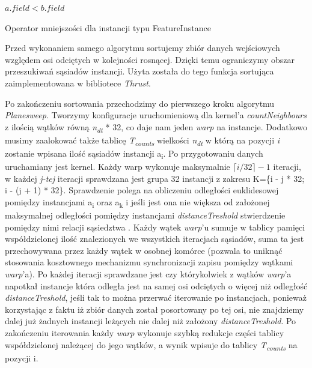 \documentclass[12pt]{article}
\makeatletter
\newcounter{operator}
\newcounter{algorytm}
\newenvironment{algorytm}[1][htb]
  {
  \renewcommand*{\algorithmcfname}{Algorytm}%
  \let\c@algocf\c@algorytm
   \begin{algorithm}[#1]
  }
  {\end{algorithm}}
\makeatother
\begin{document}
\begin{algorytm}
 \Return $ a.field < b.field $ \; 
\caption{Operator mniejszości dla instancji typu FeatureInstance}
\end{algorytm}
 
Przed wykonaniem samego algorytmu sortujemy zbiór danych wejściowych względem osi odciętych w kolejności rosnącej. Dzięki temu ograniczymy obszar przeszukiwań sąsiadów instancji. Użyta została do tego funkcja sortująca zaimplementowana w bibliotece \textit{Thrust}.

Po zakończeniu sortowania przechodzimy do pierwszego kroku algorytmu \textit{Planesweep}. Tworzymy konfiguracje uruchomieniową dla kernel'a \textit{countNeighbours} z ilością wątków równą \textit{n\textsubscript{dt}} * 32, co daje nam jeden \textit{warp} na instancje. Dodatkowo musimy zaalokować także tablicę \textit{T\textsubscript{counts}} wielkości \textit{n\textsubscript{dt}} w którą na pozycji \textit{i} zostanie wpisana ilość sąsiadów instancji a\textsubscript{i}. Po przygotowaniu danych uruchamiany jest kernel. Każdy warp wykonuje maksymalnie $\lceil i / 32\rceil - 1$ iteracji, w każdej \textit{j-tej} iteracji sprawdzana jest grupa 32 instancji z zakresu K=\{i - j * 32; i - (j + 1) * 32\}. Sprawdzenie polega na obliczeniu odległości euklidesowej pomiędzy instancjami a\textsubscript{i} oraz a\textsubscript{k} i jeśli jest ona nie większa od założonej maksymalnej odległości pomiędzy instancjami \textit{distanceTreshold} stwierdzenie pomiędzy nimi relacji sąsiedztwa . Każdy wątek \textit{warp}'u sumuje w tablicy pamięci współdzielonej ilość znalezionych we wszystkich iteracjach sąsiadów, suma ta jest przechowywana przez każdy wątek w osobnej komórce (pozwala to uniknąć stosowania kosztownego mechanizmu synchronizacji zapisu pomiędzy wątkami \textit{warp}'a). Po każdej iteracji sprawdzane jest czy którykolwiek z wątków \textit{warp}'a napotkał instancje która odległa jest na samej osi odciętych o więcej niż odległość \textit{distanceTreshold}, jeśli tak to można przerwać iterowanie po instancjach, ponieważ korzystając z faktu iż zbiór danych został posortowany po tej osi, nie znajdziemy dalej już żadnych instancji leżących nie dalej niż założony \textit{distanceTreshold}. Po zakończeniu iterowania każdy \textit{warp} wykonuje szybką redukcje części tablicy współdzielonej należącej do jego wątków, a wynik wpisuje do tablicy \textit{T\textsubscript{counts}} na pozycji i.
\end{document}

